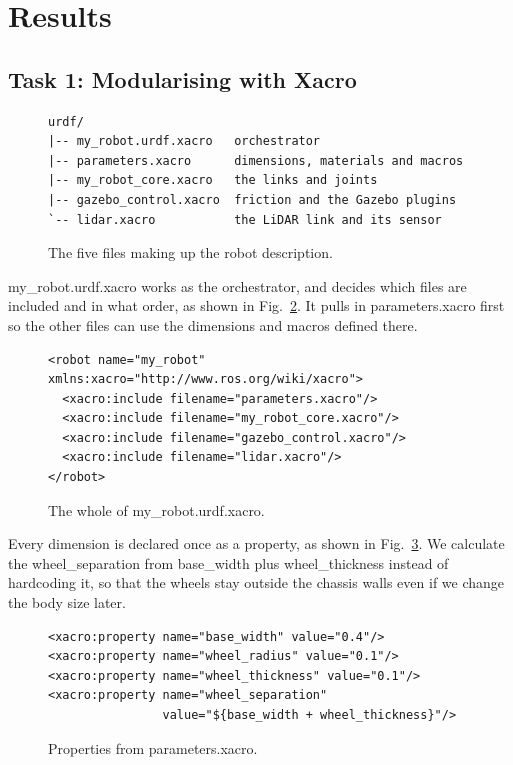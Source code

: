 \documentclass[conference]{IEEEtran}
\begin{document}
\section{Results}
\subsection*{Task 1: Modularising with Xacro}

\begin{figure}[H]
\begin{verbatim}
urdf/
|-- my_robot.urdf.xacro   orchestrator
|-- parameters.xacro      dimensions, materials and macros
|-- my_robot_core.xacro   the links and joints
|-- gazebo_control.xacro  friction and the Gazebo plugins
`-- lidar.xacro           the LiDAR link and its sensor
\end{verbatim}
\caption{The five files making up the robot description.}
\label{lst:tree}
\end{figure}
my\_robot.urdf.xacro works as the orchestrator, and decides which files are
included and in what order, as shown in Fig.~\ref{lst:toplevel}. It pulls in
parameters.xacro first so the other files can use the dimensions and macros
defined there.


\begin{figure}[H]
\begin{verbatim}
<robot name="my_robot" xmlns:xacro="http://www.ros.org/wiki/xacro">
  <xacro:include filename="parameters.xacro"/>
  <xacro:include filename="my_robot_core.xacro"/>
  <xacro:include filename="gazebo_control.xacro"/>
  <xacro:include filename="lidar.xacro"/>
</robot>
\end{verbatim}
\caption{The whole of my\_robot.urdf.xacro.}
\label{lst:toplevel}
\end{figure}

Every dimension is declared once as a property, as shown in Fig.~\ref{lst:props}.
We calculate the wheel\_separation from base\_width plus wheel\_thickness instead
of hardcoding it, so that the wheels stay outside the chassis walls even if we
change the body size later.


\begin{figure}[H]
\begin{verbatim}
<xacro:property name="base_width" value="0.4"/>
<xacro:property name="wheel_radius" value="0.1"/>
<xacro:property name="wheel_thickness" value="0.1"/>
<xacro:property name="wheel_separation"
                value="${base_width + wheel_thickness}"/>
\end{verbatim}
\caption{Properties from parameters.xacro.}
\label{lst:props}
\end{figure}
\end{document}
